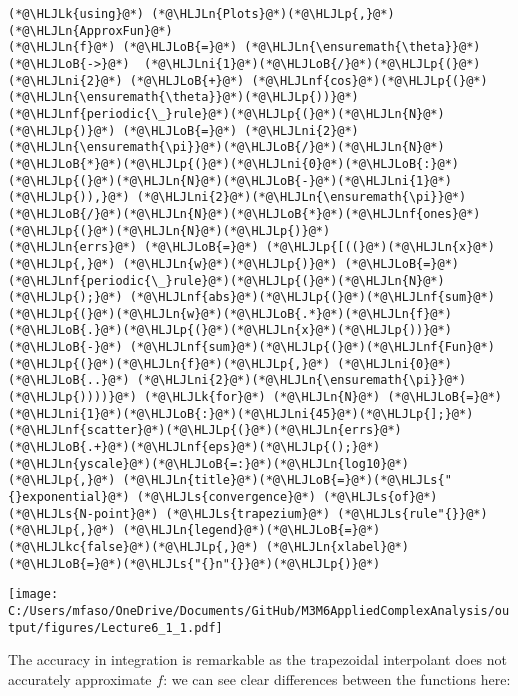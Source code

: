 \documentclass[12pt,landscape]{article}
\newcommand{\HLJLk}[1]{\textcolor[RGB]{148,91,176}{\textbf{#1}}}
\newcommand{\HLJLkc}[1]{\textcolor[RGB]{59,151,46}{\textit{#1}}}
\newcommand{\HLJLn}[1]{#1}
\newcommand{\HLJLnf}[1]{\textcolor[RGB]{66,102,213}{#1}}
\newcommand{\HLJLs}[1]{\textcolor[RGB]{201,61,57}{#1}}
\newcommand{\HLJLni}[1]{\textcolor[RGB]{59,151,46}{#1}}
\newcommand{\HLJLoB}[1]{\textcolor[RGB]{102,102,102}{\textbf{#1}}}
\newcommand{\HLJLp}[1]{#1}
\def\cent#1{\begin{center}#1\end{center} }
\begin{document}
{\begin{lstlisting}
(*@\HLJLk{using}@*) (*@\HLJLn{Plots}@*)(*@\HLJLp{,}@*) (*@\HLJLn{ApproxFun}@*)
(*@\HLJLn{f}@*) (*@\HLJLoB{=}@*) (*@\HLJLn{\ensuremath{\theta}}@*) (*@\HLJLoB{->}@*)  (*@\HLJLni{1}@*)(*@\HLJLoB{/}@*)(*@\HLJLp{(}@*)(*@\HLJLni{2}@*) (*@\HLJLoB{+}@*) (*@\HLJLnf{cos}@*)(*@\HLJLp{(}@*)(*@\HLJLn{\ensuremath{\theta}}@*)(*@\HLJLp{))}@*)
(*@\HLJLnf{periodic{\_}rule}@*)(*@\HLJLp{(}@*)(*@\HLJLn{N}@*)(*@\HLJLp{)}@*) (*@\HLJLoB{=}@*) (*@\HLJLni{2}@*)(*@\HLJLn{\ensuremath{\pi}}@*)(*@\HLJLoB{/}@*)(*@\HLJLn{N}@*)(*@\HLJLoB{*}@*)(*@\HLJLp{(}@*)(*@\HLJLni{0}@*)(*@\HLJLoB{:}@*)(*@\HLJLp{(}@*)(*@\HLJLn{N}@*)(*@\HLJLoB{-}@*)(*@\HLJLni{1}@*)(*@\HLJLp{)),}@*) (*@\HLJLni{2}@*)(*@\HLJLn{\ensuremath{\pi}}@*)(*@\HLJLoB{/}@*)(*@\HLJLn{N}@*)(*@\HLJLoB{*}@*)(*@\HLJLnf{ones}@*)(*@\HLJLp{(}@*)(*@\HLJLn{N}@*)(*@\HLJLp{)}@*)
(*@\HLJLn{errs}@*) (*@\HLJLoB{=}@*) (*@\HLJLp{[((}@*)(*@\HLJLn{x}@*)(*@\HLJLp{,}@*) (*@\HLJLn{w}@*)(*@\HLJLp{)}@*) (*@\HLJLoB{=}@*) (*@\HLJLnf{periodic{\_}rule}@*)(*@\HLJLp{(}@*)(*@\HLJLn{N}@*)(*@\HLJLp{);}@*) (*@\HLJLnf{abs}@*)(*@\HLJLp{(}@*)(*@\HLJLnf{sum}@*)(*@\HLJLp{(}@*)(*@\HLJLn{w}@*)(*@\HLJLoB{.*}@*)(*@\HLJLn{f}@*)(*@\HLJLoB{.}@*)(*@\HLJLp{(}@*)(*@\HLJLn{x}@*)(*@\HLJLp{))}@*) (*@\HLJLoB{-}@*) (*@\HLJLnf{sum}@*)(*@\HLJLp{(}@*)(*@\HLJLnf{Fun}@*)(*@\HLJLp{(}@*)(*@\HLJLn{f}@*)(*@\HLJLp{,}@*) (*@\HLJLni{0}@*) (*@\HLJLoB{..}@*) (*@\HLJLni{2}@*)(*@\HLJLn{\ensuremath{\pi}}@*)(*@\HLJLp{))))}@*) (*@\HLJLk{for}@*) (*@\HLJLn{N}@*) (*@\HLJLoB{=}@*) (*@\HLJLni{1}@*)(*@\HLJLoB{:}@*)(*@\HLJLni{45}@*)(*@\HLJLp{];}@*)
(*@\HLJLnf{scatter}@*)(*@\HLJLp{(}@*)(*@\HLJLn{errs}@*)(*@\HLJLoB{.+}@*)(*@\HLJLnf{eps}@*)(*@\HLJLp{();}@*) (*@\HLJLn{yscale}@*)(*@\HLJLoB{=:}@*)(*@\HLJLn{log10}@*)(*@\HLJLp{,}@*) (*@\HLJLn{title}@*)(*@\HLJLoB{=}@*)(*@\HLJLs{"{}exponential}@*) (*@\HLJLs{convergence}@*) (*@\HLJLs{of}@*) (*@\HLJLs{N-point}@*) (*@\HLJLs{trapezium}@*) (*@\HLJLs{rule"{}}@*)(*@\HLJLp{,}@*) (*@\HLJLn{legend}@*)(*@\HLJLoB{=}@*)(*@\HLJLkc{false}@*)(*@\HLJLp{,}@*) (*@\HLJLn{xlabel}@*)(*@\HLJLoB{=}@*)(*@\HLJLs{"{}n"{}}@*)(*@\HLJLp{)}@*)
\end{lstlisting}

\cent{\texttt{[image: C:/Users/mfaso/OneDrive/Documents/GitHub/M3M6AppliedComplexAnalysis/output/figures/Lecture6\_1\_1.pdf]}}

The accuracy in integration is remarkable as the trapezoidal interpolant does not accurately approximate $f$: we can see clear differences between the functions here:


}
\end{document}
